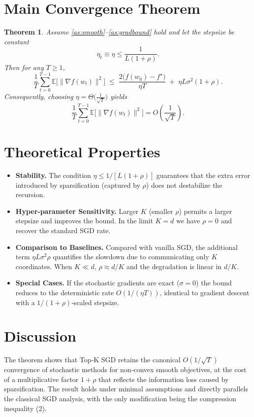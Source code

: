 \documentclass{article}
\newtheorem{theorem}{Theorem}
\begin{document}
\section*{Main Convergence Theorem}
\begin{theorem}\label{thm:main}
Assume \ref{as:smooth}–\ref{as:gradbound} hold and let the stepsize be constant
\[
\eta_t\equiv\eta\le\frac{1}{L(1+\rho)} .
\]
Then for any $T\ge1$,
\[
\frac{1}{T}\sum_{t=0}^{T-1}\mathbb{E}\big[\|\nabla f(w_t)\|^2\big]
\;\le\;
\frac{2\big(f(w_0)-f^\star\big)}{\eta T}
\;+\;
\eta L\sigma^2(1+\rho) .
\tag{3}
\]
Consequently, choosing $\eta=\Theta\big(\tfrac{1}{\sqrt{T}}\big)$ yields
\[
\frac{1}{T}\sum_{t=0}^{T-1}\mathbb{E}\big[\|\nabla f(w_t)\|^2\big]
=O\!\left(\frac{1}{\sqrt{T}}\right).
\]
\end{theorem}

\section*{Theoretical Properties}
\begin{itemize}
\item \textbf{Stability.} The condition $\eta\le1/[L(1+\rho)]$ guarantees that the extra error introduced by sparsification (captured by $\rho$) does not destabilize the recursion.
\item \textbf{Hyper‑parameter Sensitivity.} Larger $K$ (smaller $\rho$) permits a larger stepsize and improves the bound. In the limit $K=d$ we have $\rho=0$ and recover the standard SGD rate.
\item \textbf{Comparison to Baselines.} Compared with vanilla SGD, the additional term $\eta L\sigma^2\rho$ quantifies the slowdown due to communicating only $K$ coordinates. When $K\ll d$, $\rho\approx d/K$ and the degradation is linear in $d/K$.
\item \textbf{Special Cases.} If the stochastic gradients are exact ($\sigma=0$) the bound reduces to the deterministic rate $O(1/(\eta T))$, identical to gradient descent with a $1/(1+\rho)$‑scaled stepsize.
\end{itemize}

\section*{Discussion}
The theorem shows that Top‑K SGD retains the canonical $O(1/\sqrt{T})$ convergence of stochastic methods for non‑convex smooth objectives, at the cost of a multiplicative factor $1+\rho$ that reflects the information loss caused by sparsification. The result holds under minimal assumptions and directly parallels the classical SGD analysis, with the only modification being the compression inequality (2).
\end{document}
